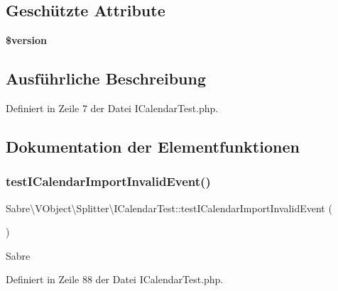 \subsection*{Geschützte Attribute}
\begin{DoxyCompactItemize}
\item 
\mbox{\label{class_sabre_1_1_v_object_1_1_splitter_1_1_i_calendar_test_ad59e36fa7a352896fa35547466306a92}} 
{\bfseries \$version}
\end{DoxyCompactItemize}


\subsection{Ausführliche Beschreibung}


Definiert in Zeile 7 der Datei I\+Calendar\+Test.\+php.



\subsection{Dokumentation der Elementfunktionen}
\mbox{\label{class_sabre_1_1_v_object_1_1_splitter_1_1_i_calendar_test_a6a9b0419746b7578bf38a9c7281cdec6}} 
\subsubsection{\texorpdfstring{test\+I\+Calendar\+Import\+Invalid\+Event()}{testICalendarImportInvalidEvent()}}
{\footnotesize\ttfamily Sabre\textbackslash{}\+V\+Object\textbackslash{}\+Splitter\textbackslash{}\+I\+Calendar\+Test\+::test\+I\+Calendar\+Import\+Invalid\+Event (\begin{DoxyParamCaption}{ }\end{DoxyParamCaption})}

Sabre 

Definiert in Zeile 88 der Datei I\+Calendar\+Test.\+php.

